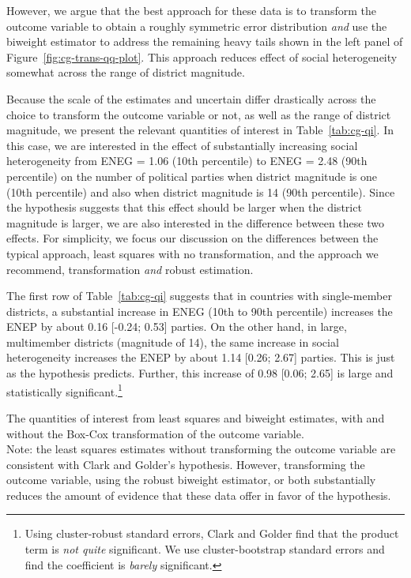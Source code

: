 \documentclass[12pt]{article}
\begin{document}
However, we argue that the best approach for these data is to transform the outcome variable to obtain a roughly symmetric error distribution \textit{and} use the biweight estimator to address the remaining heavy tails shown in the left panel of Figure~\ref{fig:cg-trans-qq-plot}. 
This approach reduces effect of social heterogeneity somewhat across the range of district magnitude.

Because the scale of the estimates and uncertain differ drastically across the choice to transform the outcome variable or not, as well as the range of district magnitude, we present the relevant quantities of interest in Table~\ref{tab:cg-qi}. 
In this case, we are interested in the effect of substantially increasing social heterogeneity from ENEG = 1.06 (10th percentile) to ENEG = 2.48 (90th percentile) on the number of political parties when district magnitude is one (10th percentile) and also when district magnitude is 14 (90th percentile). 
Since the hypothesis suggests that this effect should be larger when the district magnitude is larger, we are also interested in the difference between these two effects. 
For simplicity, we focus our discussion on the differences between the typical approach, least squares with no transformation, and the approach we recommend, transformation \textit{and} robust estimation.

The first row of Table~\ref{tab:cg-qi} suggests that in countries with single-member districts, a substantial increase in ENEG (10th to 90th percentile) increases the ENEP by about 0.16 [-0.24; 0.53] parties. 
On the other hand, in large, multimember districts (magnitude of 14), the same increase in social heterogeneity increases the ENEP by about 1.14 [0.26; 2.67] parties. 
This is just as the hypothesis predicts. 
Further, this increase of 0.98 [0.06; 2.65] is large and statistically significant.\footnote{Using cluster-robust standard errors, Clark and Golder find that the product term is \textit{not quite} significant. We use cluster-bootstrap standard errors and find the coefficient is \textit{barely} significant.}

\begin{table}[h!]
{\scriptsize

}
\caption{The quantities of interest from least squares and biweight estimates, with and without the Box-Cox transformation of the outcome variable. \\
Note: the least squares estimates without transforming the outcome variable are consistent with Clark and Golder's hypothesis. 
However, transforming the outcome variable, using the robust biweight estimator,  or both substantially reduces the amount of evidence that these data offer in favor of the hypothesis.}\label{tab:cg-qi}
\end{table}
\end{document}
